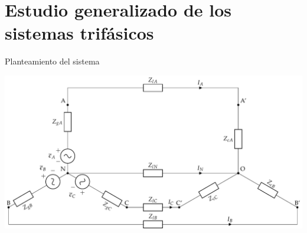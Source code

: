 \documentclass[aspectratio=169, usenames,svgnames,dvipsnames]{beamer}
\begin{document}
\section{Estudio generalizado de los sistemas trifásicos}
\label{sec:org2114402}
\begin{frame}[label={sec:org645c9d8}]{Planteamiento del sistema}
\begin{center}
\includegraphics[width=\textwidth]{../figs/CircuitoTrifasicaGeneralizado.pdf}
\end{center}
\end{frame}
\end{document}
